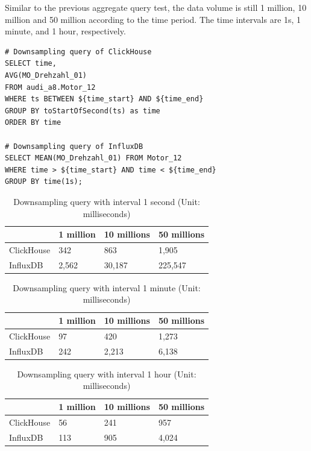 Similar to the previous aggregate query test, the data volume is still 1 million, 10 million and 50 million according to the time period. The time intervals are 1s, 1 minute, and 1 hour, respectively.
\begin{verbatim}
# Downsampling query of ClickHouse
SELECT time,
AVG(MO_Drehzahl_01)
FROM audi_a8.Motor_12
WHERE ts BETWEEN ${time_start} AND ${time_end}
GROUP BY toStartOfSecond(ts) as time
ORDER BY time

# Downsampling query of InfluxDB 
SELECT MEAN(MO_Drehzahl_01) FROM Motor_12 
WHERE time > ${time_start} AND time < ${time_end} 
GROUP BY time(1s);
\end{verbatim}

\begin{table}[hbt!]
\centering
\begin{tabular}{@{}llll@{}}
\toprule
           & 1 million & 10 millions & 50 millions \\ \midrule
ClickHouse & 342       & 863         & 1,905       \\
InfluxDB   & 2,562     & 30,187      & 225,547     \\ \bottomrule
\end{tabular}
\caption{Downsampling query with interval 1 second (Unit: milliseconds)}
\label{tab:downsampling_query_second}
\end{table}

\begin{table}[hbt!]
\centering
\begin{tabular}{@{}llll@{}}
\toprule
           & 1 million & 10 millions & 50 millions \\ \midrule
ClickHouse & 97        & 420         & 1,273       \\
InfluxDB   & 242       & 2,213       & 6,138       \\ \bottomrule
\end{tabular}
\caption{Downsampling query with interval 1 minute (Unit: milliseconds)}
\label{tab:downsampling_query_minute}
\end{table}

\begin{table}[hbt!]
\centering
\begin{tabular}{@{}llll@{}}
\toprule
           & 1 million & 10 millions & 50 millions \\ \midrule
ClickHouse & 56        & 241         & 957       \\
InfluxDB   & 113       & 905         & 4,024       \\ \bottomrule
\end{tabular}
\caption{Downsampling query with interval 1 hour (Unit: milliseconds)}
\label{tab:downsampling_query_hour}
\end{table}

